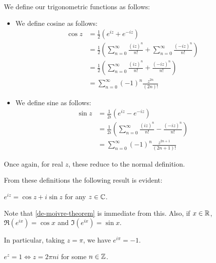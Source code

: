 \documentclass{../../template/note}
\begin{document}
    \begin{definition} We define our trigonometric functions as follows:
        
        
        \begin{itemize}
            \item We define cosine as follows:
            \begin{align*}
                \cos z &= \frac 1 2 (e^{iz}+e^{-iz}) \\
                &= \frac 1 2 \left(\sum_{n=0}^\infty \frac{(iz)^n}{n!} + \sum_{n=0}^\infty \frac{(-iz)^n}{n!} \right) \\
                &= \frac 1 2 \left(\sum_{n=0}^\infty \frac{(iz)^n}{n!} + \frac{(-iz)^n}{n!} \right) \\
                &= \sum_{n=0}^\infty (-1)^n \frac{z^{2n}}{(2n)!}
            \end{align*}
            \item We define sine as follows:
            \begin{align*}
                \sin z &= \frac 1 {2i} (e^{iz}-e^{-iz}) \\
                &= \frac 1 {2i} \left(\sum_{n=0}^\infty \frac{(iz)^n}{n!} - \frac{(-iz)^n}{n!} \right) \\
                &= \sum_{n=0}^\infty (-1)^n \frac{z^{2n+1}}{(2n+1)!}
            \end{align*}
        \end{itemize}
        
        
    \end{definition}
    
    Once again, for real \(z\), these reduce to the normal definition.

    From these definitions the following result is evident:
    
    \begin{theorem}
        \(e^{iz} = \cos z + i \sin z\) for any \(z \in \mathbb C\).
    \end{theorem}

    Note that \cref{de-moivre-theorem} is immediate from this. Also, if \(x \in \mathbb R\), \(\Re(e^{ix}) = \cos x\) and \(\Im(e^{ix}) = \sin x\).

    \begin{corollary}
        In particular, taking \(z = \pi\), we have \(e^{i \pi} = -1\).
    \end{corollary}

    \begin{lemma}
        \(e^z = 1 \iff z = 2\pi n i\) for some \(n \in \mathbb Z\).
    \end{lemma}
    
\end{document}
